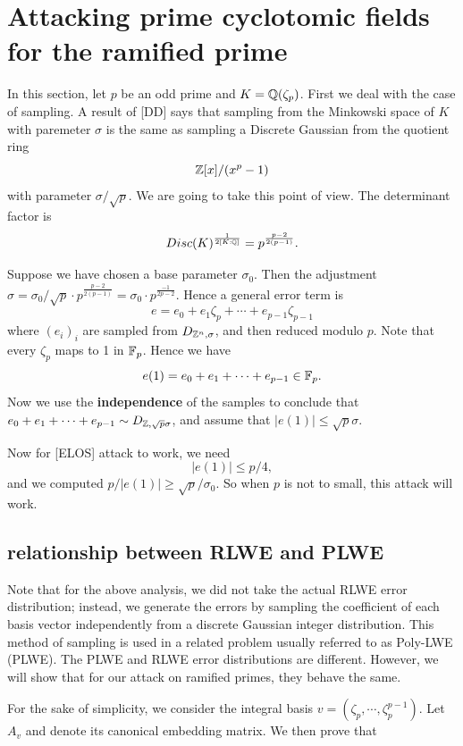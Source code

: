 \documentclass{amsart}
\begin{document}
\section{Attacking prime cyclotomic fields for the ramified prime}
\label{sec: ramified-prime}

In this section, let $p$ be an odd prime and $K = \mathbb{Q}(\zeta_p)$. First we deal with the case of sampling. A result of [DD] says that sampling from the Minkowski space of $K$ with paremeter $\sigma$ is the same as sampling a Discrete Gaussian from the quotient ring
\[
    \mathbb{Z}[x]/(x^p-1)
\]
with parameter $\sigma/\sqrt{p}$. We are going to take this point of view. The determinant factor is
$$Disc(K)^{\frac{1}{2[K:\mathbb{Q}]}} = p^{\frac{p-2}{2(p-1)}}.$$

Suppose we have chosen a base parameter $\sigma_0$. Then the adjustment $\sigma = \sigma_0/\sqrt{p} \cdot p^{\frac{p-2}{2(p-1)}} = \sigma_0 \cdot p^{\frac{-1}{2p-2}}$. Hence a general error term is
\[
    e = e_0 + e_1 \zeta_p + \cdots + e_{p-1} \zeta_{p-1}
\]
where $(e_i)_i$ are sampled from $D_{\mathbb{Z}^n, \sigma}$, and then reduced modulo $p$. Note that every $\zeta_p$ maps to 1 in $\mathbb{F}_p$. Hence we have
\[
    e(1) = e_0 + e_1 + \cdots +e_{p-1} \in \mathbb{F}_p.
\]
Now we use the {\bf independence} of the samples to conclude that $e_0 + e_1 + \cdots +e_{p-1} \sim D_{\mathbb{Z},\sqrt{p}\sigma}$, and assume that $|e(1)| \leq \sqrt{p}\sigma$.

Now for [ELOS] attack to work, we need
\[
    |e(1)| \leq p/4,
\]
and we computed $p/|e(1)| \geq \sqrt{p}/\sigma_0$. So when $p$ is not to small, this attack will work.

\subsection{relationship between RLWE and PLWE}

Note that for the above analysis, we did not take the actual RLWE error distribution; instead, we generate the errors by sampling the coefficient of each basis vector independently
from a discrete Gaussian integer distribution. This method of sampling is used in a related problem usually referred to as Poly-LWE (PLWE). The PLWE and RLWE error distributions are different. However, we will show that for our attack on ramified primes, they behave the same.


For the sake of simplicity, we consider the integral basis  $v = (\zeta_p, \cdots, \zeta_{p}^{p-1})$. Let $A_v$ and  denote its canonical embedding matrix. We then prove that
\end{document}

